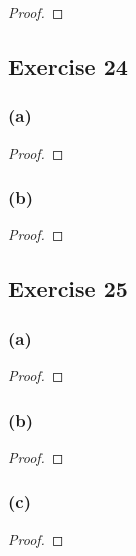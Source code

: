 \documentclass[14pt]{extarticle}
\begin{document}
\begin{proof}

\end{proof}

\subsection{Exercise 24}

\subsubsection{(a)}

\begin{proof}

\end{proof}

\subsubsection{(b)}

\begin{proof}

\end{proof}

\subsection{Exercise 25}

\subsubsection{(a)}

\begin{proof}

\end{proof}

\subsubsection{(b)}

\begin{proof}

\end{proof}

\subsubsection{(c)}

\begin{proof}

\end{proof}
\end{document}
